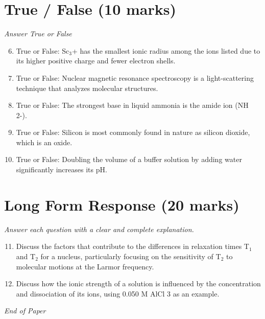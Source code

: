 \documentclass[12pt]{article}
\begin{document}
\section*{True / False (10 marks)}
\textit{Answer True or False}
\begin{enumerate}[label=\arabic*.]
\setcounter{enumi}{5}
\item True or False: Sc$_{3}$+ has the smallest ionic radius among the ions listed due to its higher positive charge and fewer electron shells.
\item True or False: Nuclear magnetic resonance spectroscopy is a light-scattering technique that analyzes molecular structures.
\item True or False: The strongest base in liquid ammonia is the amide ion (NH 2-).
\item True or False: Silicon is most commonly found in nature as silicon dioxide, which is an oxide.
\item True or False: Doubling the volume of a buffer solution by adding water significantly increases its pH.
\end{enumerate}

\section*{Long Form Response (20 marks)}
\textit{Answer each question with a clear and complete explanation.}
\begin{enumerate}[label=\arabic*.]
\setcounter{enumi}{10}
\item Discuss the factors that contribute to the differences in relaxation times T$_{1}$ and T$_{2}$ for a nucleus, particularly focusing on the sensitivity of T$_{2}$ to molecular motions at the Larmor frequency.
\item Discuss how the ionic strength of a solution is influenced by the concentration and dissociation of its ions, using 0.050 M AlCl 3 as an example.
\end{enumerate}

\vfill
\noindent\textit{End of Paper}
\end{document}
